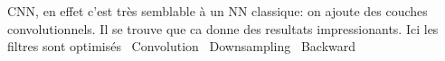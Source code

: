 \startsection[title=What is a {\em Conolutional} Neural Network]
CNN, en effet c'est très semblable à un NN classique: on ajoute des couches convolutionnels. Il se trouve que ca donne des resultats impressionants.
Ici les filtres sont optimisés
~Convolution
~Downsampling
~Backward
\stopsection